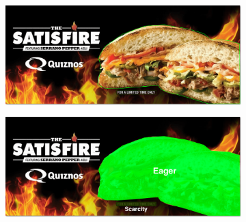 \begin{figure}[!h]
    \centering
    \begin{subfigure}[b]{0.4\textwidth}
        \includegraphics[scale=0.2]{images/Image1.png}
    \end{subfigure}
    \begin{subfigure}[b]{0.4\textwidth}
        \includegraphics[scale=0.2]{images/Image1_Segment.png}




\end{subfigure}
\end{figure}
